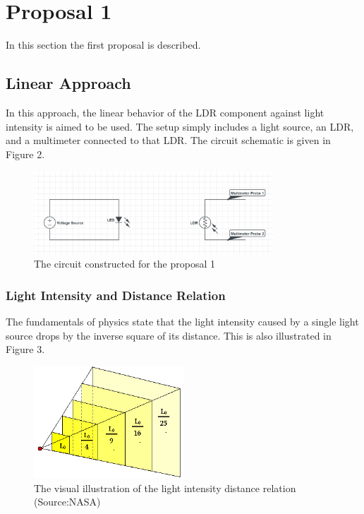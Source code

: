 \documentclass[letterpaper,12pt]{article}
\begin{document}
\section{Proposal 1}
In this section the first proposal is described.
\subsection{Linear Approach}
In this approach, the linear behavior of the LDR component against light intensity is aimed to be used. The setup simply includes a light source, an LDR, and a multimeter connected to that LDR. The circuit schematic is given in Figure 2.
\begin{figure}[H]
	\centering
   \includegraphics[width=0.8\textwidth]{circuit1.png}
   \caption{The circuit constructed for the proposal 1}
\end{figure} 

\subsubsection{Light Intensity and Distance Relation}
The fundamentals of physics state that the light intensity caused by a single light source drops by the inverse square of its distance. This is also illustrated in Figure 3.
\begin{figure}[H]
	\centering
   \includegraphics[width=0.5\textwidth]{light_intensity_vs_distance.png}
   \caption{The visual illustration of the light intensity distance relation (Source:NASA)}
\end{figure} 
\end{document}
